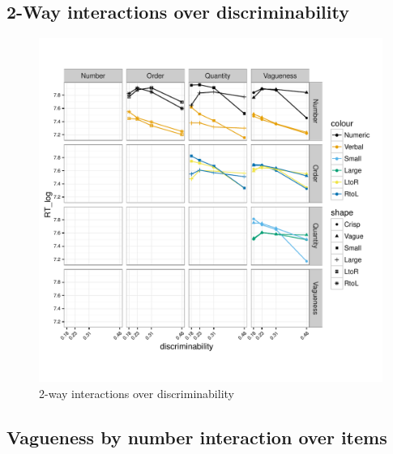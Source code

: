 \documentclass[a4paper,12pt,twoside]{article}\usepackage[]{graphicx}\usepackage[]{color}
\makeatletter
\def\maxwidth{ %
  \ifdim\Gin@nat@width>\linewidth
    \linewidth
  \else
    \Gin@nat@width
  \fi
}
\newenvironment{knitrout}{}{} %
\makeatother
\begin{document}
\clearpage
\subsection{2-Way interactions over discriminability}


\begin{knitrout}\scriptsize
{}\color{fgcolor}\begin{figure}[hbtp]

{\centering \includegraphics[width=\maxwidth]{figure/graphics-22way-1} 

}

\caption[2-way interactions over discriminability]{2-way interactions over discriminability}\label{fig:22way}
\end{figure}


\end{knitrout}

\clearpage
\subsection{Vagueness by number interaction over items}
\end{document}
